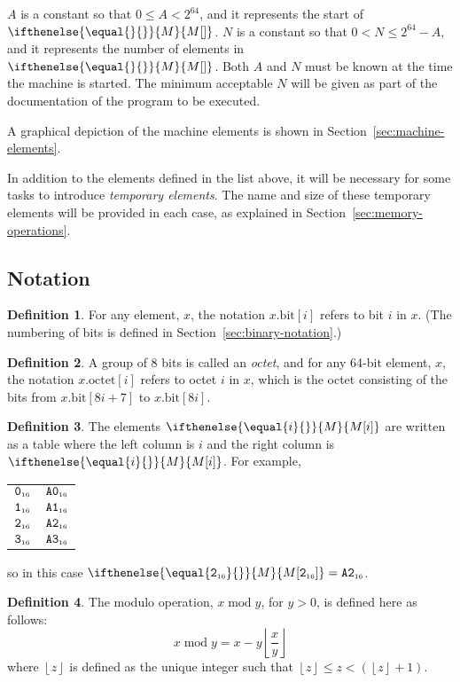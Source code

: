 \documentclass[a4paper,12pt]{article}
\makeatletter
\newcommand{\num}[1]{\texttt{#1}}
\newcommand{\hex}[1]{\num{#1}_{\textup{\tiny 16}}}
\newcommand{\MEM}[1]{\ifthenelse{\equal{#1}{}}{M}{M[#1]}}
\newcommand{\octno}[2]{#1.\mathrm{octet}[#2]}
\newcommand{\bitno}[2]{#1.\mathrm{bit}[#2]}
\DeclareMathOperator{\MOD}{mod}
\newcommand{\modulo}[2]{#1 \MOD #2}
\theoremstyle{definition}
\newtheorem{definition}{Definition}
\newenvironment{memtable}{%
  \begin{trivlist}
    \item
    }{%
    \end{trivlist}}
\newenvironment{memcolumn}{%
  \begin{tabular}{@{}ll@{}}
    \hline}
    {%
    \hline
  \end{tabular}}
\makeatother
\begin{document}
$A$ is a constant so that $0 \le A < 2^{64}$, and it represents the start of $\MEM{}$.
$N$ is a constant so that $0 < N \le 2^{64}-A$, and it represents the number of elements in $\MEM{}$.
Both $A$ and $N$ must be known at the time the machine is started.
The minimum acceptable $N$ will be given as part of the documentation of the program to be executed.

A graphical depiction of the machine elements is shown in Section~\ref{sec:machine-elements}.

In addition to the elements defined in the list above, it will be necessary for some tasks to introduce \emph{temporary elements}.
The name and size of these temporary elements will be provided in each case, as explained in Section~\ref{sec:memory-operations}.

\subsection{Notation}

\begin{definition}
For any element, $x$, the notation $\bitno{x}{i}$ refers to bit $i$ in $x$. (The numbering of bits is defined in Section~\ref{sec:binary-notation}.)
\end{definition}

\begin{definition}
A group of 8 bits is called an \emph{octet}, and for any 64-bit element, $x$, the notation $\octno{x}{i}$ refers to octet $i$ in $x$, which is the octet consisting of the bits from $\bitno{x}{8i+7}$ to $\bitno{x}{8i}$.
\end{definition}

\begin{definition}
The elements $\MEM{i}$ are written as a table where the left column is $i$ and the right column is $\MEM{i}$.  For example,
\begin{memtable}
  \begin{memcolumn}
    $\hex{0}$ & $\hex{A0}$ \\
    $\hex{1}$ & $\hex{A1}$ \\
    $\hex{2}$ & $\hex{A2}$ \\
    $\hex{3}$ & $\hex{A3}$ \\
  \end{memcolumn}
\end{memtable}
so in this case $\MEM{\hex{2}} = \hex{A2}$.
\end{definition}

\begin{definition}
The modulo operation, $\modulo{x}{y}$, for $y>0$, is defined here as follows:
\[ \modulo{x}{y} = x - y \left \lfloor \frac{x}{y} \right \rfloor \]
where $\left \lfloor z \right \rfloor$ is defined as the unique integer such that $\left \lfloor z \right \rfloor \le z < (\left \lfloor z \right \rfloor + 1)$.
\end{definition}
\end{document}
